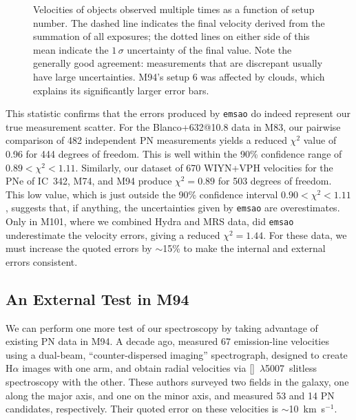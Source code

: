 \documentclass[12pt,preprint]{emulateapj}
\newcommand{\kms}{km~s$^{-1}$}
\newcommand{\Oline}{[\ion{O}{3}]~$\lambda$5007}
\begin{document}
\begin{figure}
\caption{Velocities of objects observed multiple times as a function of setup number.  The dashed line indicates the final velocity derived from the summation of all exposures;  the dotted lines on either side of this mean indicate the $1 \, \sigma$ uncertainty of the final value.  Note the generally good agreement: measurements that are discrepant usually have large uncertainties.  M94's setup 6 was affected by clouds, which explains its significantly larger error bars. \label{mult_obs} }
\end{figure}

This statistic confirms that the errors produced by {\tt emsao} do indeed represent our true measurement scatter.   For the Blanco+632@10.8 data in M83, our pairwise comparison of 482 independent PN measurements yields a reduced $\chi^2$ value of 0.96 for 444 degrees of freedom.  This is well within the 90\% confidence range of $0.89 < \chi^2 < 1.11$.  Similarly, our dataset of 670 WIYN+VPH velocities for the PNe of IC~342, M74, and M94 produce $\chi^2 = 0.89$ for 503 degrees of freedom.   This low value, which is just outside the 90\% confidence interval $0.90 < \chi^2 < 1.11$, suggests that, if anything, the uncertainties given by {\tt emsao} are overestimates.  Only in M101, where we combined Hydra and MRS data, did {\tt emsao} underestimate the velocity errors, giving a reduced $\chi^2 = 1.44$.  For these data, we must increase the quoted errors by $\sim$15\% to make the internal and external errors consistent.

\subsection{An External Test in M94}
We can perform one more test of our spectroscopy by taking advantage of existing PN data in M94.  A decade ago, \citet{M94PNS} measured 67 emission-line velocities using a dual-beam, ``counter-dispersed imaging'' spectrograph, designed to create H$\alpha$ images with one arm, and obtain radial velocities via \Oline\ slitless spectroscopy with the other.  These authors surveyed two fields in the galaxy, one along the major axis, and one on the minor axis, and measured 53 and 14 PN candidates, respectively.  Their quoted error on these velocities is $\sim$10~\kms.
\end{document}
